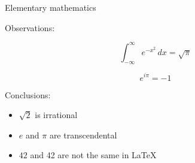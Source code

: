 \documentclass[pdf,azure,slideColor,colorBG]{prosper}
\begin{document}
\begin{slide}{Elementary mathematics}

Observations:

\[
    \int_{-\infty}^\infty e^{-x^2} \, dx = \sqrt{\pi}
\]

\[
    e^{i\pi} = -1
\]

Conclusions:

\begin{itemize}
    \item $\sqrt{2}$ is irrational
    \item $e$ and $\pi$ are transcendental
    \item $42$ and 42 are not the same in \LaTeX
\end{itemize}

\end{slide}
\end{document}
